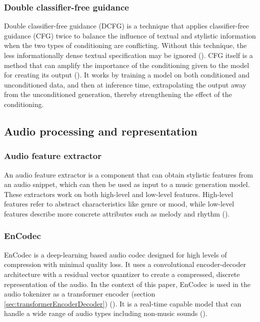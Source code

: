 \documentclass[a4paper,12pt,twoside]{article}
\begin{document}
\subsubsection*{Double classifier-free guidance}\label{sec:DCFG}

Double classifier-free guidance (DCFG) is a technique that applies classifier-free guidance (CFG) twice to balance the influence of textual and stylistic information when the two types of conditioning are conflicting. Without this technique, the less informationally dense textual specification may be ignored (\cite{rouardAudioConditioningMusic2024}). CFG itself is a method that can amplify the importance of the conditioning given to the model for creating its output (\cite{hoClassifierFreeDiffusionGuidance2022}). It works by training a model on both conditioned and unconditioned data, and then at inference time, extrapolating the output away from the unconditioned generation, thereby strengthening the effect of the conditioning.

\subsection{Audio processing and representation}

\subsubsection*{Audio feature extractor}\label{sec:audioFeatureExtractor}

An audio feature extractor is a component that can obtain stylistic features from an audio snippet, which can then be used as input to a music generation model. These extractors work on both high-level and low-level features. High-level features refer to abstract characteristics like genre or mood, while low-level features describe more concrete attributes such as melody and rhythm (\cite{rouardAudioConditioningMusic2024}).

\subsubsection*{EnCodec}\label{sec:encodec}

EnCodec is a deep-learning based audio codec designed for high levels of compression with minimal quality loss. It uses a convolutional encoder-decoder architecture with a residual vector quantizer to create a compressed, discrete representation of the audio. In the context of this paper, EnCodec is used in the audio tokenizer as a transformer encoder (section \ref{sec:transformerEncoderDecoder}) (\cite{rouardAudioConditioningMusic2024}). It is a real-time capable model that can handle a wide range of audio types including non-music sounds (\cite{defossezHighFidelityNeural2022}).
\end{document}
